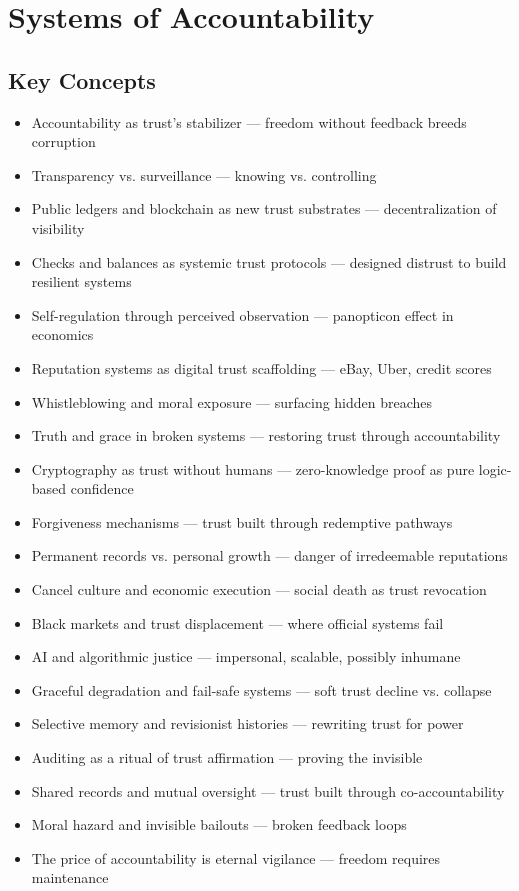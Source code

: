 \documentclass[11pt,oneside]{book}
\begin{document}
\chapter{ Systems of Accountability}

\section{Key Concepts}

\begin{itemize}
\item Accountability as trust's stabilizer — freedom without feedback breeds corruption
\item Transparency vs. surveillance — knowing vs. controlling
\item Public ledgers and blockchain as new trust substrates — decentralization of visibility
\item Checks and balances as systemic trust protocols — designed distrust to build resilient systems
\item Self-regulation through perceived observation — panopticon effect in economics
\item Reputation systems as digital trust scaffolding — eBay, Uber, credit scores
\item Whistleblowing and moral exposure — surfacing hidden breaches
\item Truth and grace in broken systems — restoring trust through accountability
\item Cryptography as trust without humans — zero-knowledge proof as pure logic-based confidence
\item Forgiveness mechanisms — trust built through redemptive pathways
\item Permanent records vs. personal growth — danger of irredeemable reputations
\item Cancel culture and economic execution — social death as trust revocation
\item Black markets and trust displacement — where official systems fail
\item AI and algorithmic justice — impersonal, scalable, possibly inhumane
\item Graceful degradation and fail-safe systems — soft trust decline vs. collapse
\item Selective memory and revisionist histories — rewriting trust for power
\item Auditing as a ritual of trust affirmation — proving the invisible
\item Shared records and mutual oversight — trust built through co-accountability
\item Moral hazard and invisible bailouts — broken feedback loops
\item The price of accountability is eternal vigilance — freedom requires maintenance
\end{itemize}
\end{document}
